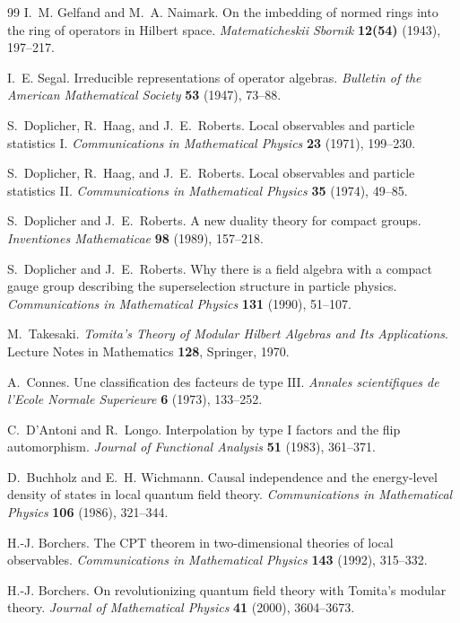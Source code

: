 \begin{thebibliography}{99}
I.~M. Gelfand and M.~A. Naimark.
On the imbedding of normed rings into the ring of operators in Hilbert space.
\emph{Matematicheskii Sbornik} \textbf{12(54)} (1943), 197--217.

I.~E. Segal.
Irreducible representations of operator algebras.
\emph{Bulletin of the American Mathematical Society} \textbf{53} (1947),
73--88.

S.~Doplicher, R.~Haag, and J.~E.~Roberts.
Local observables and particle statistics I.
\emph{Communications in Mathematical Physics} \textbf{23} (1971), 199--230.

S.~Doplicher, R.~Haag, and J.~E.~Roberts.
Local observables and particle statistics II.
\emph{Communications in Mathematical Physics} \textbf{35} (1974), 49--85.

S.~Doplicher and J.~E.~Roberts.
A new duality theory for compact groups.
\emph{Inventiones Mathematicae} \textbf{98} (1989), 157--218.

S.~Doplicher and J.~E.~Roberts.
Why there is a field algebra with a compact gauge group describing the
superselection structure in particle physics.
\emph{Communications in Mathematical Physics} \textbf{131} (1990), 51--107.

M.~Takesaki.
\emph{Tomita's Theory of Modular Hilbert Algebras and Its Applications}.
Lecture Notes in Mathematics \textbf{128}, Springer, 1970.

A.~Connes.
Une classification des facteurs de type \(\mathrm{III}\).
\emph{Annales scientifiques de l'Ecole Normale Superieure} \textbf{6}
(1973), 133--252.

C.~D'Antoni and R.~Longo.
Interpolation by type I factors and the flip automorphism.
\emph{Journal of Functional Analysis} \textbf{51} (1983), 361--371.

D.~Buchholz and E.~H. Wichmann.
Causal independence and the energy-level density of states in local quantum
field theory.
\emph{Communications in Mathematical Physics} \textbf{106} (1986), 321--344.

H.-J. Borchers.
The CPT theorem in two-dimensional theories of local observables.
\emph{Communications in Mathematical Physics} \textbf{143} (1992), 315--332.

H.-J. Borchers.
On revolutionizing quantum field theory with Tomita's modular theory.
\emph{Journal of Mathematical Physics} \textbf{41} (2000), 3604--3673.


\end{thebibliography}
